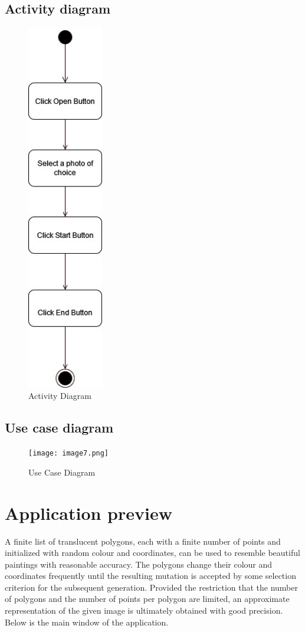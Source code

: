 \section{Activity diagram}
\begin{figure}
\centering
\includegraphics[width=1.3in]{images/image15.png}
\caption{Activity Diagram}
\end{figure}
\clearpage

\section{Use case diagram}
\begin{figure}
\centering
\texttt{[image: image7.png]}
\caption{Use Case Diagram}
\end{figure}
\clearpage

\chapter{Application preview}
\label{application-preview}
{
A finite list of translucent polygons, each with a finite number of points and initialized with random colour and coordinates, can be used to resemble beautiful paintings with reasonable accuracy. The polygons change their colour and coordinates frequently until the resulting mutation is accepted by some selection criterion for the subsequent generation. Provided the restriction that the number of polygons and the number of points per polygon are limited, an approximate representation of the given image is ultimately obtained with good precision. Below is the main window of the application.
}

